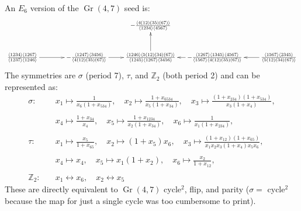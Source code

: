 \documentclass[11pt]{article}
\DeclareMathOperator{\Gr}{Gr}
\begin{document}
An $E_6$ version of the $\Gr(4,7)$ seed is:
\begin{equation}
\begin{gathered}
\begin{xy} 0;<1pt,0pt>:<0pt,-1pt>::
	(0,50) *+{\frac{\langle 1234\rangle  \langle 1267\rangle }{\langle
   		1237\rangle  \langle 1246\rangle }} ="1",
	(100,50) *+{-\frac{\langle 1247\rangle  \langle 3456\rangle
 	  	}{\langle 4(12)(35)(67)\rangle }} ="2",
	(200,50) *+{\frac{\langle 1246\rangle  \langle 5(12)(34)(67)\rangle
 	  	}{\langle 1245\rangle  \langle 1267\rangle  \langle
   		3456\rangle }} ="3",
	(200,0) *+{-\frac{\langle 4(12)(35)(67)\rangle }{\langle
   		1234\rangle  \langle 4567\rangle }} ="4",
	(300,50) *+{-\frac{\langle 1267\rangle  \langle 1345\rangle  \langle
   		4567\rangle }{\langle 1567\rangle  \langle
   		4(12)(35)(67)\rangle }} ="5",
	(400,50) *+{\frac{\langle 1567\rangle  \langle 2345\rangle }{\langle
   		5(12)(34)(67)\rangle }} ="6",
	"1", {\ar"2"},
	"2", {\ar"3"},
	"3", {\ar"4"},
	"5", {\ar"3"},
	"6", {\ar"5"},
\end{xy}
\end{gathered}
\end{equation}
The symmetries are $\sigma$ (period 7), $\tau$, and $\mathbb{Z}_2$ (both period 2) and can be represented as:
\begin{align*}
	\sigma:\quad &x_1\mapsto \frac{1}{x_6
   \left(1+x_{534}\right)}, \quad x_2\mapsto \frac{1+x_{6534}}{x_5
   \left(1+x_{34}\right)}, \quad x_3\mapsto
   \frac{\left(1+x_{234}\right)
   \left(1+x_{534}\right)}{x_3
   \left(1+x_4\right)},\\ \\ 
   &x_4\mapsto
   \frac{1+x_{34}}{x_4}, \quad x_5\mapsto \frac{1+x_{1234}}{x_2
   \left(1+x_{34}\right)}, \quad x_6\mapsto \frac{1}{x_1
   \left(1+x_{234}\right)},\\ \\
   \tau: \quad&x_1\mapsto \frac{x_5}{1+x_{65}},\quad x_2\mapsto
   \left(1+x_5\right) x_6,\quad x_3\mapsto
   \frac{\left(1+x_{12}\right)
   \left(1+x_{65}\right)}{x_1 x_2 x_3 \left(1+x_4\right)
   x_5 x_6},\\ \\ 
   &x_4\mapsto x_4,\quad x_5\mapsto x_1
   \left(1+x_2\right),\quad x_6\mapsto
   \frac{x_2}{1+x_{12}},\\ \\
   \mathbb{Z}_2:\quad &x_1 \leftrightarrow x_6, \quad x_2 \leftrightarrow x_5
\end{align*}
These are directly equivalent to $\Gr(4,7)$ cycle$^2$, flip, and parity ($\sigma = $ cycle$^2$ because the map for just a single cycle was too cumbersome to print).
\end{document}
